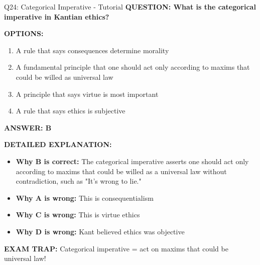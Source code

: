 \documentclass[8pt]{beamer}
\begin{document}
	\begin{frame}{Q24: Categorical Imperative - Tutorial}
		\fontsize{6.5}{7.5}\selectfont
		\textbf{QUESTION: What is the categorical imperative in Kantian ethics?}
		
		\vspace{0.1cm}
		\textbf{OPTIONS:}
		\begin{enumerate}
			\item A rule that says consequences determine morality
			\item A fundamental principle that one should act only according to maxims that could be willed as universal law
			\item A principle that says virtue is most important
			\item A rule that says ethics is subjective
		\end{enumerate}
		
		\vspace{0.1cm}
		\textcolor{myblue}{\textbf{ANSWER: B}}
		
		\vspace{0.1cm}
		\textbf{DETAILED EXPLANATION:}
		\begin{itemize}
			\item \textbf{Why B is correct:} The categorical imperative asserts one should act only according to maxims that could be willed as a universal law without contradiction, such as "It's wrong to lie."
			\item \textbf{Why A is wrong:} This is consequentialism
			\item \textbf{Why C is wrong:} This is virtue ethics
			\item \textbf{Why D is wrong:} Kant believed ethics was objective
		\end{itemize}
		
		\textcolor{myred}{\textbf{EXAM TRAP:}} Categorical imperative = \textcolor{myblue}{act on maxims that could be universal law}!
	\end{frame}
	
\end{document}
